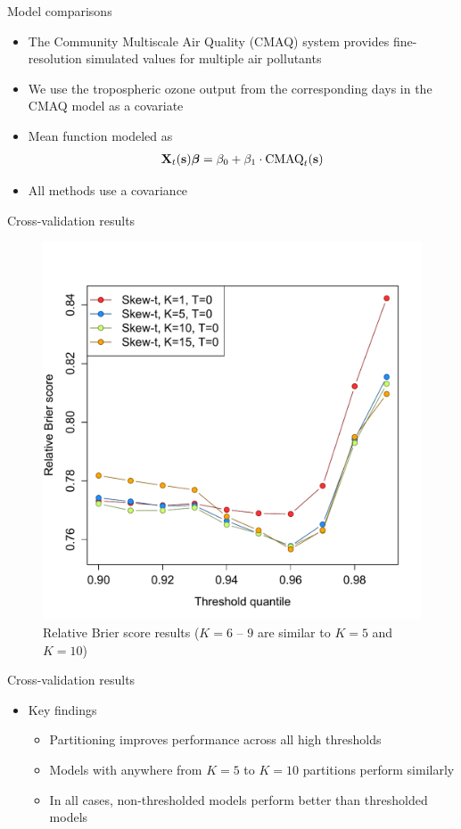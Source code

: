 \documentclass{beamer}
\begin{document}
\begin{frame}{Model comparisons}
  \begin{itemize} \setlength{\itemsep}{1em}
    \item The Community Multiscale Air Quality (CMAQ) system provides fine-resolution simulated values for multiple air pollutants
    \item We use the tropospheric ozone output from the corresponding days in the CMAQ model as a covariate
    \item Mean function modeled as
    \begin{align*}
    	\mbox{\bf X}_t(\mbox{\bf s}) \mbox{\boldmath $\beta$} = \beta_0 + \beta_1 \cdot \text{CMAQ}_t (\mbox{\bf s})
    \end{align*}
    \item All methods use a \Matern covariance
   \end{itemize}
\end{frame}

\begin{frame}{Cross-validation results}
  \centering
  \begin{figure}
    \includegraphics[width=0.6\linewidth, trim=0 0 0 1in]{./plots/pot/bs-ozone-1.pdf}
    \caption{Relative Brier score results ($K = 6$ -- $9$ are similar to $K = 5$ and $K = 10$)}
  \end{figure}
\end{frame}

\begin{frame}{Cross-validation results}
  \begin{itemize} \setlength{\itemsep}{1em}
    \item Key findings
    \begin{itemize}
      \item Partitioning improves performance across all high thresholds
      \item Models with anywhere from $K = 5$ to $K = 10$ partitions perform similarly
      \item In all cases, non-thresholded models perform better than thresholded models
    \end{itemize}
  \end{itemize}
\end{frame}
\end{document}
